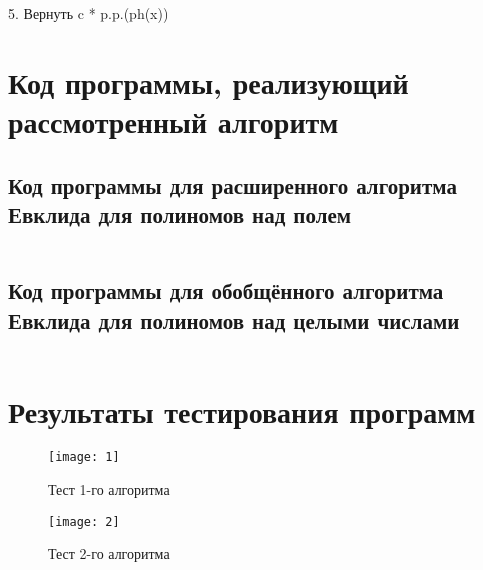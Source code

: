 \documentclass[spec, och, labwork]{shiza}
\begin{document}
5. Вернуть c * p.p.(ph(x))

\section{Код программы, реализующий рассмотренный алгоритм}

\subsection{Код программы для расширенного алгоритма Евклида для полиномов над полем}
   \inputminted[fontsize=\small]{scala}{../code/task14.1.scala}
\subsection{Код программы для обобщённого алгоритма Евклида для полиномов над целыми числами}
   \inputminted[fontsize=\small]{scala}{../code/task14.2.scala}
    
\section{Результаты тестирования программ}

        \begin{figure}[H]
            \centering      %
            \texttt{[image: 1]}
            \caption{Тест 1-го алгоритма}
            \label{fig:image1}
        \end{figure}
        
        \begin{figure}[H]
            \centering      %
            \texttt{[image: 2]}
            \caption{Тест 2-го алгоритма}
            \label{fig:image1}
        \end{figure}
\end{document}
